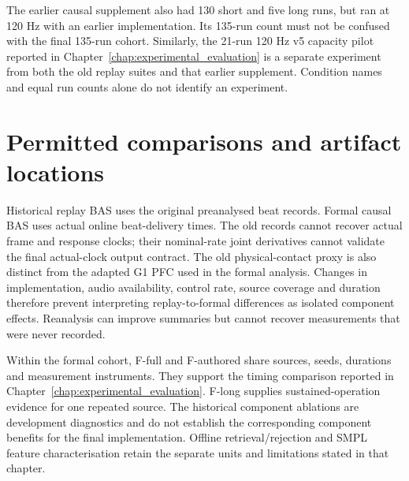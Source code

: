 The earlier causal supplement also had 130 short and five long runs, but ran
at 120 Hz with an earlier implementation. Its 135-run count must not be
confused with the final 135-run cohort. Similarly, the 21-run 120 Hz v5
capacity pilot reported in Chapter~\ref{chap:experimental_evaluation} is a
separate experiment from both the old replay suites and that earlier supplement.
Condition names and equal run counts alone do not identify an experiment.

\section{Permitted comparisons and artifact locations}

Historical replay BAS uses the original preanalysed beat records. Formal
causal BAS uses actual online beat-delivery times. The old records cannot
recover actual frame and response clocks; their nominal-rate joint derivatives
cannot validate the final actual-clock output contract. The old physical-contact
proxy is also distinct from the adapted G1 PFC used in the formal analysis.
Changes in implementation, audio availability, control rate, source coverage
and duration therefore prevent interpreting replay-to-formal differences as
isolated component effects. Reanalysis can improve summaries but cannot recover
measurements that were never recorded.

Within the formal cohort, F-full and F-authored share sources, seeds, durations
and measurement instruments. They support the timing comparison reported in
Chapter~\ref{chap:experimental_evaluation}. F-long supplies sustained-operation
evidence for one repeated source. The historical component ablations are
development diagnostics and do not establish the corresponding component
benefits for the final implementation. Offline retrieval/rejection and SMPL
feature characterisation retain the separate units and limitations stated in
that chapter.

